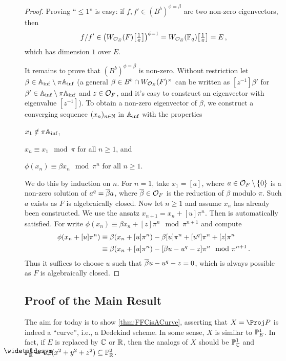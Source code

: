 \documentclass[a4paper, 10pt, oneside, DIV=9, chapterprefix=true, numbers=enddot,bibliography=totoc]{scrbook}
\begin{document}
\begin{proof}
	Proving \enquote{$\leq 1$} is easy: if $f,f'\in (B^b)^{\phi=\beta}$ are two non-zero eigenvectors, then
	\begin{equation*}
		f/f'\in\left(W_{\Oo_E}(F)\localize{\pi}\right)^{\phi=1}=W_{\Oo_E}(\IF_q)\localize{\pi}=E\,,
	\end{equation*}
	which has dimension $1$ over $E$.
	
	It remains to prove that $(B^b)^{\phi=\beta}$ is non-zero. Without restriction let $\beta\in\mathbb{A}_{\mathrm{inf}}\setminus\pi\mathbb{A}_{\mathrm{inf}}$ (a general $\beta\in B^b\cap W_{\mathcal{O}_E}(F)^\times$ can be written as $[z^{-1}]\beta'$ for $\beta'\in \mathbb{A}_{\mathrm{inf}}\setminus \pi\mathbb{A}_{\mathrm{inf}}$ and $z\in \mathcal{O}_F$, and it's easy to construct an eigenvector with eigenvalue $[z^{-1}]$). To obtain a non-zero eigenvector of $\beta$, we construct a converging sequence $(x_n)_{n\in\mathbb{N}}$ in $\mathbb{A}_{\mathrm{inf}}$ with the properties
	\begin{numerate}
		\item $x_1\notin\pi\mathbb{A}_{\mathrm{inf}}$,
		\item $x_n\equiv x_1\mod \pi$ for all $n\geq 1$, and
		\item $\phi(x_n)\equiv \beta x_n\mod\pi^n$ for all $n\geq 1$.
	\end{numerate}
	We do this by induction on $n$. For $n=1$, take $x_1=[a]$, where $a\in \mathcal{O}_F\setminus\{0\}$ is a non-zero solution of $a^q=\ov{\beta }a$, where $\ov{\beta}\in \Oo_F$ is the reduction of $\beta$ modulo $\pi$. Such $a$ exists as $F$ is algebraically closed. Now let $n\geq1$ and assume $x_n$ has already been constructed. We use the ansatz $x_{n+1}=x_n+[u]\pi^n$. Then  is automatically satisfied. For  write $\phi(x_n)\equiv \beta x_n+[z]\pi^n\mod \pi^{n+1}$ and compute
	\begin{align*}
		\phi(x_n+[u]\pi^n)&\equiv \beta(x_n+[u]\pi^n)-\beta[u]\pi^n+[u^q]\pi^n+[z]\pi^n\\
		&\equiv \beta(x_n+[u]\pi^n)-[\ov{\beta}u-u^q-z]\pi^n\mod \pi^{n+1}\,.
	\end{align*}
	Thus it suffices to choose $u$ such that $\ov{\beta}u-u^q-z=0$, which is always possible as $F$ is algebraically closed.
\end{proof}
\subsection{Proof of the Main Result}
The aim for today is to show \cref{thm:FFCisACurve}, asserting that $X=\Proj P$ is indeed a \enquote{curve}, i.e., a Dedekind scheme. In some sense, $X$ is similar to $\mathbb{P}_E^1$. In fact, if $E$ is replaced by $\mathbb{C}$ or $\mathbb{R}$, then the analogs of $X$ should be $\mathbb{P}_{\mathbb{C}}^1$ and $\snake{\IP}_\IR^1=V_+(x^2+y^2+z^2)\subseteq \IP_\IR^2$.
\end{document}
